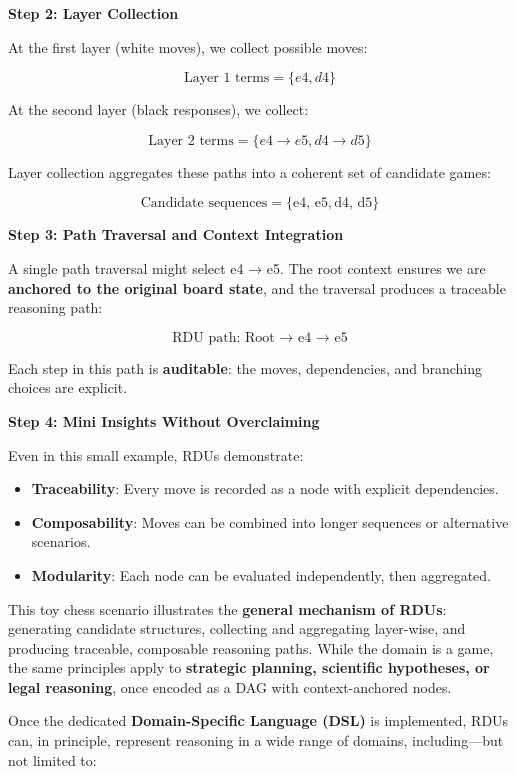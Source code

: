 \documentclass[12pt]{article}
\begin{document}
\textbf{Step 2: Layer Collection}  

At the first layer (white moves), we collect possible moves:

\[
\text{Layer 1 terms} = \{ e4, d4 \}
\]

At the second layer (black responses), we collect:

\[
\text{Layer 2 terms} = \{ e4 \to e5, d4 \to d5 \}
\]

Layer collection aggregates these paths into a coherent set of candidate games:

\[
\text{Candidate sequences} = \{ \text{e4, e5}, \text{d4, d5} \}
\]

\textbf{Step 3: Path Traversal and Context Integration}  

A single path traversal might select e4 → e5. The root context ensures we are \textbf{anchored to the original board state}, and the traversal produces a traceable reasoning path:

\[
\text{RDU path: Root → e4 → e5}
\]

Each step in this path is \textbf{auditable}: the moves, dependencies, and branching choices are explicit.

\textbf{Step 4: Mini Insights Without Overclaiming}  

Even in this small example, RDUs demonstrate:

\begin{itemize}
    \item \textbf{Traceability}: Every move is recorded as a node with explicit dependencies.  
    \item \textbf{Composability}: Moves can be combined into longer sequences or alternative scenarios.  
    \item \textbf{Modularity}: Each node can be evaluated independently, then aggregated.  
\end{itemize}

This toy chess scenario illustrates the \textbf{general mechanism of RDUs}: generating candidate structures, collecting and aggregating layer-wise, and producing traceable, composable reasoning paths. While the domain is a game, the same principles apply to \textbf{strategic planning, scientific hypotheses, or legal reasoning}, once encoded as a DAG with context-anchored nodes.

Once the dedicated \textbf{Domain-Specific Language (DSL)} is implemented, RDUs can, in principle, represent reasoning in a wide range of domains, including—but not limited to:
\end{document}
